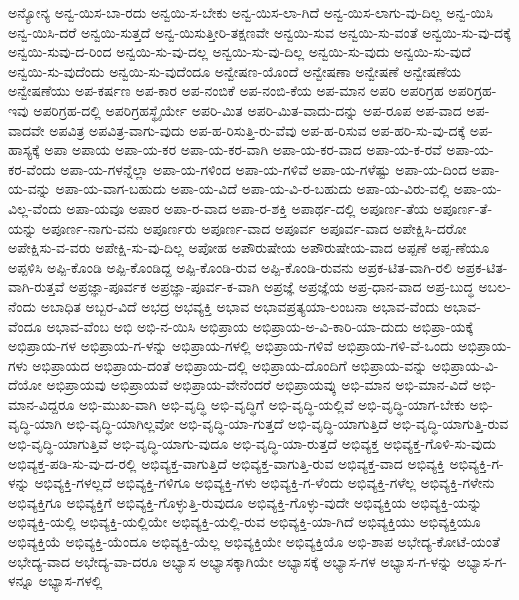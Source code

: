 {ಅನ್ಯೋನ್ಯ
ಅನ್ವ-ಯಿಸ-ಬಾ-ರದು
ಅನ್ವಯಿ-ಸ-ಬೇಕು
ಅನ್ವ-ಯಿಸ-ಲಾ-ಗಿದೆ
ಅನ್ವ-ಯಿಸ-ಲಾಗು-ವು-ದಿಲ್ಲ
ಅನ್ವ-ಯಿಸಿ
ಅನ್ವ-ಯಿಸಿ-ದರೆ
ಅನ್ವಯಿ-ಸುತ್ತದೆ
ಅನ್ವ-ಯಿಸುತ್ತೀರಿ-ತಕ್ಷಣವೇ
ಅನ್ವಯಿ-ಸುವ
ಅನ್ವಯಿ-ಸು-ವಂತೆ
ಅನ್ವಯಿ-ಸು-ವು-ದಕ್ಕೆ
ಅನ್ವಯಿ-ಸುವು-ದ-ರಿಂದ
ಅನ್ವಯಿ-ಸು-ವು-ದಲ್ಲ
ಅನ್ವಯಿ-ಸು-ವು-ದಿಲ್ಲ
ಅನ್ವಯಿ-ಸು-ವುದು
ಅನ್ವಯಿ-ಸು-ವುದೆ
ಅನ್ವಯಿ-ಸು-ವುದೆಂದು
ಅನ್ವಯಿ-ಸು-ವುದೆಂದೂ
ಅನ್ವೇಷಣ-ಯೊಂದೆ
ಅನ್ವೇಷಣಾ
ಅನ್ವೇಷಣೆ
ಅನ್ವೇಷಣೆಯ
ಅನ್ವೇಷಣೆಯು
ಅಪ-ಕರ್ಷಣ
ಅಪ-ಕಾರ
ಅಪ-ನಂಬಿಕೆ
ಅಪ-ನಂಬಿ-ಕೆಯ
ಅಪ-ಮಾನ
ಅಪರಿ
ಅಪರಿಗ್ರಹ
ಅಪರಿಗ್ರಹ-ಇವು
ಅಪರಿಗ್ರಹ-ದಲ್ಲಿ
ಅಪರಿಗ್ರಹಸ್ಥೈರ್ಯೇ
ಅಪರಿ-ಮಿತ
ಅಪರಿ-ಮಿತ-ವಾದು-ದನ್ನು
ಅಪ-ರೂಪ
ಅಪ-ವಾದ
ಅಪ-ವಾದವೇ
ಅಪವಿತ್ರ
ಅಪವಿತ್ರ-ವಾಗು-ವುದು
ಅಪ-ಹ-ರಿಸುತ್ತಿ-ರು-ವೆವು
ಅಪ-ಹ-ರಿಸುವ
ಅಪ-ಹರಿ-ಸು-ವು-ದಕ್ಕೆ
ಅಪ-ಹಾಸ್ಯಕ್ಕೆ
ಅಪಾ
ಅಪಾಯ
ಅಪಾ-ಯ-ಕರ
ಅಪಾ-ಯ-ಕರ-ವಾಗಿ
ಅಪಾ-ಯ-ಕರ-ವಾದ
ಅಪಾ-ಯ-ಕ-ರವೆ
ಅಪಾ-ಯ-ಕರ-ವೆಂದು
ಅಪಾ-ಯ-ಗಳನ್ನೆಲ್ಲಾ
ಅಪಾ-ಯ-ಗಳಿಂದ
ಅಪಾ-ಯ-ಗಳಿವೆ
ಅಪಾ-ಯ-ಗಳೆಷ್ಟು
ಅಪಾ-ಯ-ದಿಂದ
ಅಪಾ-ಯ-ವನ್ನು
ಅಪಾ-ಯ-ವಾಗ-ಬಹುದು
ಅಪಾ-ಯ-ವಿದೆ
ಅಪಾ-ಯ-ವಿ-ರ-ಬಹುದು
ಅಪಾ-ಯ-ವಿರು-ವಲ್ಲಿ
ಅಪಾ-ಯ-ವಿಲ್ಲ-ವೆಂದು
ಅಪಾ-ಯವೂ
ಅಪಾರ
ಅಪಾ-ರ-ವಾದ
ಅಪಾ-ರ-ಶಕ್ತಿ
ಅಪಾರ್ಥ-ದಲ್ಲಿ
ಅಪೂರ್ಣ-ತೆಯ
ಅಪೂರ್ಣ-ತೆ-ಯನ್ನು
ಅಪೂರ್ಣ-ನಾಗು-ವನು
ಅಪೂರ್ಣರು
ಅಪೂರ್ಣ-ವಾದ
ಅಪೂರ್ವ
ಅಪೂರ್ವ-ವಾದ
ಅಪೇಕ್ಷಿಸಿ-ದರೋ
ಅಪೇಕ್ಷಿಸು-ವ-ವರು
ಅಪೇಕ್ಷಿ-ಸು-ವು-ದಿಲ್ಲ
ಅಪೋಹ
ಅಪೌರುಷೇಯ
ಅಪೌರುಷೇಯ-ವಾದ
ಅಪ್ಪಣೆ
ಅಪ್ಪ-ಣೆಯೂ
ಅಪ್ಪಳಿಸಿ
ಅಪ್ಪಿ-ಕೊಂಡಿ
ಅಪ್ಪಿ-ಕೊಂಡಿದ್ದ
ಅಪ್ಪಿ-ಕೊಂಡಿ-ರುವ
ಅಪ್ಪಿ-ಕೊಂಡಿ-ರುವನು
ಅಪ್ರಕ-ಟಿತ-ವಾಗಿ-ರಲಿ
ಅಪ್ರಕ-ಟಿತ-ವಾಗಿ-ರುತ್ತವೆ
ಅಪ್ರಜ್ಞಾ-ಪೂರ್ವಕ
ಅಪ್ರಜ್ಞಾ-ಪೂರ್ವ-ಕ-ವಾಗಿ
ಅಪ್ರಜ್ಞೆ
ಅಪ್ರಜ್ಞೆಯ
ಅಪ್ರ-ಧಾನ-ವಾದ
ಅಪ್ರ-ಬುದ್ಧ
ಅಬಲ-ನೆಂದು
ಅಬಾಧಿತ
ಅಬ್ಬರ-ವಿದೆ
ಅಭದ್ರ
ಅಭವ್ಯಕ್ತಿ
ಅಭಾವ
ಅಭಾವಪ್ರತ್ಯಯಾ-ಲಂಬನಾ
ಅಭಾವ-ವೆಂದು
ಅಭಾವ-ವೆಂದೂ
ಅಭಾವ-ವೆಂಬ
ಅಭಿ
ಅಭಿ-ನ-ಯಿಸಿ
ಅಭಿಪ್ರಾಯ
ಅಭಿಪ್ರಾಯ-ಅ-ವಿ-ಕಾರಿ-ಯಾ-ದುದು
ಅಭಿಪ್ರಾ-ಯಕ್ಕೆ
ಅಭಿಪ್ರಾಯ-ಗಳ
ಅಭಿಪ್ರಾಯ-ಗ-ಳನ್ನು
ಅಭಿಪ್ರಾಯ-ಗಳಲ್ಲಿ
ಅಭಿಪ್ರಾಯ-ಗಳಿವೆ
ಅಭಿಪ್ರಾಯ-ಗಳಿ-ವೆ-ಒಂದು
ಅಭಿಪ್ರಾಯ-ಗಳು
ಅಭಿಪ್ರಾಯದ
ಅಭಿಪ್ರಾಯ-ದಂತೆ
ಅಭಿಪ್ರಾಯ-ದಲ್ಲಿ
ಅಭಿಪ್ರಾಯ-ದೊಂದಿಗೆ
ಅಭಿಪ್ರಾಯ-ವನ್ನು
ಅಭಿಪ್ರಾಯ-ವಿ-ದೆಯೋ
ಅಭಿಪ್ರಾಯವು
ಅಭಿಪ್ರಾಯವೆ
ಅಭಿಪ್ರಾಯ-ವೇನೆಂದರೆ
ಅಭಿಪ್ರಾಯವ್ಕು
ಅಭಿ-ಮಾನ
ಅಭಿ-ಮಾನ-ವಿದೆ
ಅಭಿ-ಮಾನ-ವಿದ್ದರೂ
ಅಭಿ-ಮುಖ-ವಾಗಿ
ಅಭಿ-ವೃದ್ಧಿ
ಅಭಿ-ವೃದ್ಧಿಗೆ
ಅಭಿ-ವೃದ್ಧಿ-ಯಲ್ಲಿವೆ
ಅಭಿ-ವೃದ್ಧಿ-ಯಾಗ-ಬೇಕು
ಅಭಿ-ವೃದ್ಧಿ-ಯಾಗಿ
ಅಭಿ-ವೃದ್ಧಿ-ಯಾಗಿಲ್ಲವೋ
ಅಭಿ-ವೃದ್ಧಿ-ಯಾ-ಗುತ್ತದೆ
ಅಭಿ-ವೃದ್ಧಿ-ಯಾಗುತ್ತಿದೆ
ಅಭಿ-ವೃದ್ಧಿ-ಯಾಗುತ್ತಿ-ರುವ
ಅಭಿ-ವೃದ್ಧಿ-ಯಾಗುತ್ತಿವೆ
ಅಭಿ-ವೃದ್ಧಿ-ಯಾಗು-ವುದೂ
ಅಭಿ-ವೃದ್ಧಿ-ಯಾ-ರುತ್ತದೆ
ಅಭಿವ್ಯಕ್ತ
ಅಭಿವ್ಯಕ್ತ-ಗೊಳಿ-ಸು-ವುದು
ಅಭಿವ್ಯಕ್ತ-ಪಡಿ-ಸು-ವು-ದ-ರಲ್ಲಿ
ಅಭಿವ್ಯಕ್ತ-ವಾಗುತ್ತಿದೆ
ಅಭಿವ್ಯಕ್ತ-ವಾಗುತ್ತಿ-ರುವ
ಅಭಿವ್ಯಕ್ತ-ವಾದ
ಅಭಿವ್ಯಕ್ತಿ
ಅಭಿವ್ಯಕ್ತಿ-ಗ-ಳನ್ನು
ಅಭಿವ್ಯಕ್ತಿ-ಗಳಲ್ಲದೆ
ಅಭಿವ್ಯಕ್ತಿ-ಗಳಿಗೂ
ಅಭಿವ್ಯಕ್ತಿ-ಗಳು
ಅಭಿವ್ಯಕ್ತಿ-ಗ-ಳೆಂದು
ಅಭಿವ್ಯಕ್ತಿ-ಗಳೆಲ್ಲ
ಅಭಿವ್ಯಕ್ತಿ-ಗಳೇನು
ಅಭಿವ್ಯಕ್ತಿಗೂ
ಅಭಿವ್ಯಕ್ತಿಗೆ
ಅಭಿವ್ಯಕ್ತಿ-ಗೊಳ್ಳುತ್ತಿ-ರುವುದೂ
ಅಭಿವ್ಯಕ್ತಿ-ಗೊಳ್ಳು-ವುದೇ
ಅಭಿವ್ಯಕ್ತಿಯ
ಅಭಿವ್ಯಕ್ತಿ-ಯನ್ನು
ಅಭಿವ್ಯಕ್ತಿ-ಯಲ್ಲಿ
ಅಭಿವ್ಯಕ್ತಿ-ಯಲ್ಲಿಯೇ
ಅಭಿವ್ಯಕ್ತಿ-ಯಲ್ಲಿ-ರುವ
ಅಭಿವ್ಯಕ್ತಿ-ಯಾ-ಗಿದೆ
ಅಭಿವ್ಯಕ್ತಿಯು
ಅಭಿವ್ಯಕ್ತಿಯೂ
ಅಭಿವ್ಯಕ್ತಿಯೆ
ಅಭಿವ್ಯಕ್ತಿ-ಯೆಂದೂ
ಅಭಿವ್ಯಕ್ತಿ-ಯೆಲ್ಲ
ಅಭಿವ್ಯಕ್ತಿಯೇ
ಅಭಿವ್ಯಕ್ತಿಯೊ
ಅಭಿ-ಶಾಪ
ಅಭೇದ್ಯ-ಕೋಟೆ-ಯಂತೆ
ಅಭೇದ್ಯ-ವಾದ
ಅಭೇದ್ಯ-ವಾ-ದರೂ
ಅಭ್ಯಾಸ
ಅಭ್ಯಾಸಕ್ಕಾಗಿಯೇ
ಅಭ್ಯಾಸಕ್ಕೆ
ಅಭ್ಯಾಸ-ಗಳ
ಅಭ್ಯಾಸ-ಗ-ಳನ್ನು
ಅಭ್ಯಾಸ-ಗ-ಳನ್ನೂ
ಅಭ್ಯಾಸ-ಗಳಲ್ಲಿ
}
